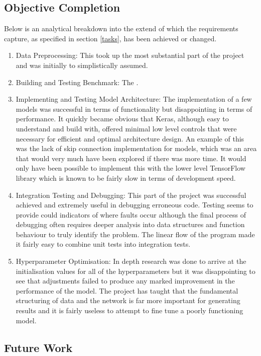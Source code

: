 \documentclass[10pt,onecolumn,letterpaper]{article}
\begin{document}
\subsection{Objective Completion}

Below is an analytical breakdown into the extend of which the requirements capture, as specified in section \ref{tasks}, has been achieved or changed. 

\begin{enumerate}
	\item Data Preprocessing: This took up the most substantial part of the project and was initially to simplistically assumed.
	 \item Building and Testing Benchmark: The . 
	\item Implementing and Testing Model Architecture: The implementation of a few models was successful in terms of functionality but disappointing in terms of performance. It quickly became obvious that Keras, although easy to understand and build with, offered minimal low level controls that were necessary for efficient and optimal architecture design. An example of this was the lack of skip connection implementation for models, which was an area that would very much have been explored if there was more time. It would only have been possible to implement this with the lower level TensorFlow library which is known to be fairly slow in terms of development speed.
	\item Integration Testing and Debugging: This part of the project was successful achieved and extremely useful in debugging erroneous code. Testing seems to provide could indicators of where faults occur although the final process of debugging often requires deeper analysis into data structures and function behaviour to truly identify the problem. The linear flow of the program made it fairly easy to combine unit tests into integration tests.
	\item Hyperparameter Optimisation: In depth research was done to arrive at the initialisation values for all of the hyperparameters but it was disappointing to see that adjustments failed to produce any marked improvement in the performance of the model. The project has taught that the fundamental structuring of data and the network is far more important for generating results and it is fairly useless to attempt to fine tune a poorly functioning model.  
\end{enumerate}

\subsection{Future Work} 
\end{document}
